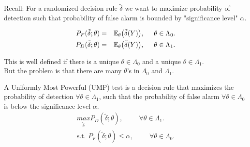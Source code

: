 \documentclass[a4paper,english,12pt]{article}
\begin{document}
Recall: For a randomized decision rule $\tilde{\delta}$ we want to maximize probability of detection such that probability of false alarm is bounded by "significance level" $\alpha$.

\begin{eqnarray}
P_F(\tilde{\delta}; \theta) &=& \mathbb{E}_\theta\big(\tilde{\delta}(Y)\big), \hspace{0.5cm} \theta \in \Lambda_0.\\
P_D(\tilde{\delta}; \theta) &=& \mathbb{E}_\theta\big(\tilde{\delta}(Y)\big), \hspace{0.5cm} \theta \in \Lambda_1.
\end{eqnarray}	

This is well defined if there is a unique $\theta \in \Lambda_0$ and a unique $\theta \in \Lambda_1$.\\
But the problem is that there are many $\theta$'s in $\Lambda_0$ and $\Lambda_1$.\\

\begin{defn}
A Uniformly Most Powerful (UMP) test is a decision rule that maximizes the probability of detection $\forall \theta \in \Lambda_1$, such that the probability of false alarm $\forall \theta \in \Lambda_0$ is below the significance level $\alpha$.
\begin{eqnarray*}
\underset{\tilde{\delta}}{max} P_D(\tilde{\delta}; \theta), \hspace{1cm} \forall \theta \in \Lambda_1.\\
\text{s.t.  } P_F(\tilde{\delta}; \theta) \leq \alpha, \hspace{1cm} \forall \theta \in \Lambda_0.
\end{eqnarray*}	
\end{defn}
	 
\end{document}
